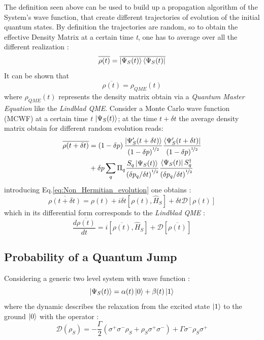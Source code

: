 \documentclass[a4paper,12pt]{article}
\begin{document}
	The definition seen above can be used to build up a propagation algorithm of the System's wave function, that create different trajectories of evolution of the initial quantum states. \newline 
	By definition the trajectories are random, so to obtain the effective Density Matrix at a certain time \textit{t}, one has to average over all the different realization : 
	\begin{equation}
	 	\overline{\rho (t)} = \overline{\ket{\Psi_{S} (t)}\bra{\Psi_{S} (t)}}
	\end{equation}
	It can be shown that
	\begin{equation}
		 \overline{\rho (t)} = \rho_{QME} (t)
	\end{equation} where $ \rho_{QME} (t) $ 
	represents the density matrix obtain via a \textit{Quantum Master Equation} like the \textit{Lindblad QME}. \newline
	Consider a Monte Carlo wave function (MCWF) at a certain time \textit{t} $ \ket{\Psi_{S} (t)} $; at the time $ t + \delta t $ the average density matrix obtain for different random evolution reads:
	\begin{align}
		\overline{\rho (t + \delta t)} &= \left(1 - \delta p\right) \frac{\ket{\Psi_{S}' (t+ \delta t)}}{\left(1 - \delta p\right)^{\nicefrac{1}{2}}} \frac{\bra{\Psi_{S}' (t+ \delta t)}}{\left(1 - \delta p\right)^{\nicefrac{1}{2}}} \notag \\
		&+ \delta p \sum_{q}{ \Pi_{q} \frac{S_{q} \ket{\Psi_{S} (t)}}{\left(\delta p_{q} / \delta t\right)^{\nicefrac{1}{2}}} \frac{ \bra{\Psi_{S} (t)} S_{q}^{\dagger}}{\left(\delta p_{q} / \delta t\right)^{\nicefrac{1}{2}}} }
	\end{align}
	introducing Eq.\ref{eq:Non_Hermitian_evolution} one obtains : 
	\begin{equation}
		\overline{\rho (t + \delta t)} = \rho (t) + i \delta t \left[ \rho (t), \hat{H}_{S} \right] + \delta t \mathcal{D} \left[\rho (t)\right]
	\end{equation}
	which in its differential form corresponds to the \textit{Lindblad QME} : 
	\begin{equation}
		\frac{d \overline{\rho (t)}}{dt} = i \left[ \overline{\rho (t)}, \hat{H}_{S} \right] + \mathcal{D} \left[\overline{\rho (t)}\right]
	\end{equation}
	
	\subsection{Probability of a Quantum Jump}
	Considering a generic two level system with wave function : 
	\begin{equation}
 		\ket{\Psi_{S} (t)} = \alpha (t) \ket{0} + \beta (t) \ket{1}
	\end{equation}
	where the dynamic describes the relaxation from the excited state $ \ket{1} $ to the ground $ \ket{0} $ with the operator : 
	\begin{equation}
			\mathcal{D} \left(\rho_{S}\right) = - \frac{\Gamma}{2} \left(\sigma^{+} \sigma^{-} \rho_{S} + \rho_{S}\sigma^{+} \sigma^{-}\right) + \Gamma \sigma^{-} \rho_{S} \sigma^{+}
	\end{equation}
	
\end{document}
